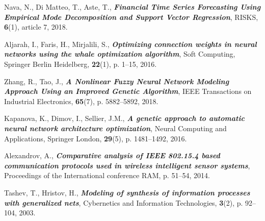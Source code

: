 \documentclass[graybox]{svmult}
\begin{document}
\begin{thebibliography}{99}

 Nava, N., Di Matteo, T., Aste, T., \textbf{\textit{Financial Time Series Forecasting Using Empirical Mode Decomposition and Support Vector Regression}}, RISKS, \textbf{6}(1), article 7, 2018.

 Aljarah, I., Faris, H., Mirjalili, S., \textbf{\textit{Optimizing connection weights in neural networks using the whale optimization algorithm}}, Soft Computing, Springer Berlin Heidelberg, \textbf{22}(1), p. 1--15, 2016.

 Zhang, R., Tao, J., \textbf{\textit{A Nonlinear Fuzzy Neural Network Modeling Approach Using an Improved Genetic Algorithm}}, IEEE Transactions on Industrial Electronics, \textbf{65}(7), p. 5882--5892, 2018.

 Kapanova, K., Dimov, I., Sellier, J.M., \textbf{\textit{A genetic approach to automatic neural network architecture optimization}}, Neural Computing and Applications, Springer London, \textbf{29}(5), p. 1481--1492, 2016.

 Alexandrov, A., \textbf{\textit{Comparative analysis of IEEE 802.15.4 based communication protocols used in wireless intelligent sensor systems}}, Proceedings of the International conference RAM, p. 51--54, 2014.

 Tashev, T., Hristov, H., \textbf{\textit{Modeling of synthesis of information processes with generalized nets}}, Cybernetics and Information Technologies, \textbf{3}(2), p. 92--104, 2003.

\end{thebibliography}
\end{document}

